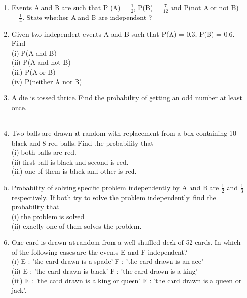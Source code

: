 \begin{enumerate}[label=\arabic*.,ref=\thesubsection.\theenumi]
\item Events A and B are such that P (A) = $\frac{1}{2}$, P(B) = $\frac{7}{12}$ and P(not A or not B) = $\frac{1}{4}$. State whether A and B are independent ?\\

\item Given two independent events A and B such that P(A) = 0.3, P(B) = 0.6. Find\\
(i) P(A and B)\\
(ii) P(A and not B)\\
(iii) P(A or B)\\
(iv) P(neither A nor B)\\

\item A die is tossed thrice. Find the probability of getting an odd number at least once.\\
\\
\solution


\item Two balls are drawn at random with replacement from a box containing 10 black and 8 red balls. Find the probability that\\
(i) both balls are red.\\
(ii) first ball is black and second is red.\\
(iii) one of them is black and other is red.\\
\solution


\item Probability of solving specific problem independently by A and B are $\frac{1}{2}$
and $\frac{1}{3}$ respectively. If both try to solve the problem independently, find the probability that\\
(i) the problem is solved \\
(ii) exactly one of them solves the problem.\\
\solution


\item One card is drawn at random from a well shuffled deck of 52 cards. In which of the following cases are the events E and F independent?\\
(i) E : 'the card drawn is a spade'
F : 'the card drawn is an ace'\\
(ii) E : 'the card drawn is black'
F : 'the card drawn is a king'\\
(iii) E : 'the card drawn is a king or queen'
F : 'the card drawn is a queen or jack'.\\
\solution



\end{enumerate}

